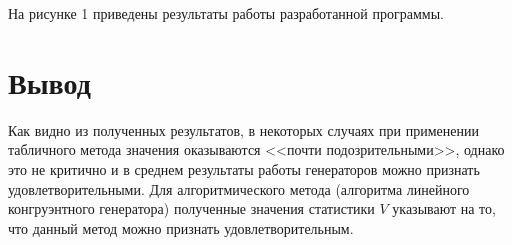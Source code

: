 На рисунке 1 приведены результаты работы разработанной программы.


\section*{Вывод}
Как видно из полученных результатов, в некоторых случаях при применении табличного метода
значения оказываются <<почти подозрительными>>, однако это не критично и в среднем результаты
работы генераторов можно признать удовлетворительными. Для алгоритмического метода (алгоритма линейного конгруэнтного генератора) полученные значения статистики $V$ указывают на то, что данный метод можно признать удовлетворительным.
